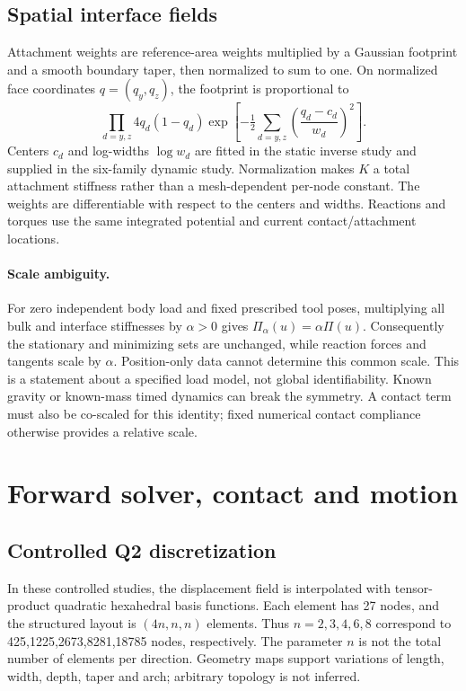 \documentclass[10pt,twocolumn,letterpaper]{article}
\begin{document}
\subsection{Spatial interface fields}
Attachment weights are reference-area weights multiplied by a Gaussian footprint and a smooth boundary taper, then normalized to sum to one. On normalized face coordinates $q=(q_y,q_z)$, the footprint is proportional to
\begin{equation}
 \prod_{d=y,z}4q_d(1-q_d)\exp\left[-\tfrac12\sum_{d=y,z}\left(\frac{q_d-c_d}{w_d}\right)^2\right].
\end{equation}
Centers $c_d$ and log-widths $\log w_d$ are fitted in the static inverse study and supplied in the six-family dynamic study. Normalization makes $K$ a total attachment stiffness rather than a mesh-dependent per-node constant. The weights are differentiable with respect to the centers and widths. Reactions and torques use the same integrated potential and current contact/attachment locations.

\paragraph{Scale ambiguity.}
For zero independent body load and fixed prescribed tool poses, multiplying all bulk and interface stiffnesses by $\alpha>0$ gives $\Pi_\alpha(u)=\alpha\Pi(u)$. Consequently the stationary and minimizing sets are unchanged, while reaction forces and tangents scale by $\alpha$. Position-only data cannot determine this common scale. This is a statement about a specified load model, not global identifiability. Known gravity or known-mass timed dynamics can break the symmetry. A contact term must also be co-scaled for this identity; fixed numerical contact compliance otherwise provides a relative scale.

\section{Forward solver, contact and motion}
\subsection{Controlled Q2 discretization}
In these controlled studies, the displacement field is interpolated with tensor-product quadratic hexahedral basis functions. Each element has 27 nodes, and the structured layout is $(4n,n,n)$ elements. Thus $n=2,3,4,6,8$ correspond to 425,1225,2673,8281,18785 nodes, respectively. The parameter $n$ is not the total number of elements per direction. Geometry maps support variations of length, width, depth, taper and arch; arbitrary topology is not inferred.
\end{document}
